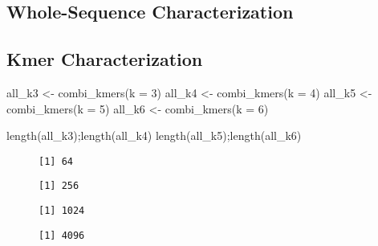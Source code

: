 \documentclass[
  letterpaper,
]{article}
\newenvironment{Shaded}{\begin{snugshade}}{\end{snugshade}}
\newcommand{\AttributeTok}[1]{\textcolor[rgb]{0.40,0.45,0.13}{#1}}
\newcommand{\DecValTok}[1]{\textcolor[rgb]{0.68,0.00,0.00}{#1}}
\newcommand{\FunctionTok}[1]{\textcolor[rgb]{0.28,0.35,0.67}{#1}}
\newcommand{\NormalTok}[1]{\textcolor[rgb]{0.00,0.23,0.31}{#1}}
\newcommand{\OtherTok}[1]{\textcolor[rgb]{0.00,0.23,0.31}{#1}}
\begin{document}
\subsection{Whole-Sequence
Characterization}\label{whole-sequence-characterization}

\subsection{Kmer Characterization}\label{kmer-characterization}

\begin{Shaded}
\begin{Highlighting}[]
\NormalTok{all\_k3 }\OtherTok{\textless{}{-}} \FunctionTok{combi\_kmers}\NormalTok{(}\AttributeTok{k =} \DecValTok{3}\NormalTok{)}
\NormalTok{all\_k4 }\OtherTok{\textless{}{-}} \FunctionTok{combi\_kmers}\NormalTok{(}\AttributeTok{k =} \DecValTok{4}\NormalTok{)}
\NormalTok{all\_k5 }\OtherTok{\textless{}{-}} \FunctionTok{combi\_kmers}\NormalTok{(}\AttributeTok{k =} \DecValTok{5}\NormalTok{)}
\NormalTok{all\_k6 }\OtherTok{\textless{}{-}} \FunctionTok{combi\_kmers}\NormalTok{(}\AttributeTok{k =} \DecValTok{6}\NormalTok{)}

\FunctionTok{length}\NormalTok{(all\_k3);}\FunctionTok{length}\NormalTok{(all\_k4)}
\FunctionTok{length}\NormalTok{(all\_k5);}\FunctionTok{length}\NormalTok{(all\_k6)}
\end{Highlighting}
\end{Shaded}

\begin{figure}

\begin{minipage}{0.25\linewidth}

\begin{verbatim}
[1] 64
\end{verbatim}

\end{minipage}%
%
\begin{minipage}{0.25\linewidth}

\begin{verbatim}
[1] 256
\end{verbatim}

\end{minipage}%
%
\begin{minipage}{0.25\linewidth}

\begin{verbatim}
[1] 1024
\end{verbatim}

\end{minipage}%
%
\begin{minipage}{0.25\linewidth}

\begin{verbatim}
[1] 4096
\end{verbatim}

\end{minipage}%

\end{figure}%
\end{document}
